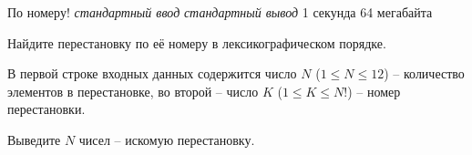 \begin{problem}%
{По номеру!}%
{\textsl{стандартный ввод}}%
{\textsl{стандартный вывод}}%
{1 секунда}%
{64 мегабайта}{}

Найдите перестановку по её номеру в лексикографическом порядке.

\InputFile

В первой строке входных данных содержится число $N$ ($1 \le N \le 12$) – количество элементов в перестановке, во второй – число $K$ ($1 \le K \le N!$) – номер перестановки.

\OutputFile

Выведите $N$ чисел – искомую перестановку.

\Examples

\begin{example}
%
\end{example}
\end{problem}